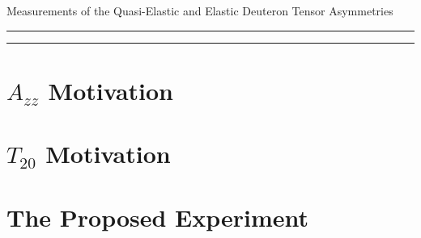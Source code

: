 \documentclass[12pt]{article}
\begin{document}
\pagestyle{empty}
 
\begin{center}
 \LARGE{
  Measurements of the Quasi-Elastic and Elastic Deuteron Tensor Asymmetries
 }
\end{center}
%
\hrule \vspace{.05cm}\hrule
%


\newpage

\begin{abstract}
  
\end{abstract}

\newpage


%


\clearpage


\tableofcontents


\pagestyle{plain}

\clearpage

%

\section{$A_{zz}$ Motivation}









\section{$T_{20}$ Motivation}



\section{The Proposed Experiment}
\end{document}
